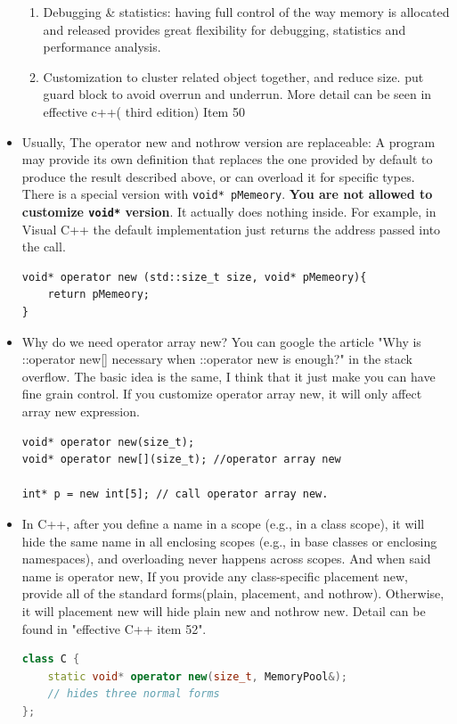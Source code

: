 \documentclass[a4paper,11pt,twoside]{book}
\begin{document}
\begin{itemize}
\begin{enumerate}
		\item Debugging \& statistics: having full control of the way memory is allocated and released provides great flexibility for debugging, statistics and performance analysis.
		
		\item Customization to cluster related object together, and reduce size. put guard block to avoid overrun and underrun. More detail can be seen in effective c++( third edition) Item 50
	\end{enumerate}
	
	\item Usually, The operator new and nothrow version are replaceable: A program may provide its own definition that replaces the one provided by default to produce the result described above, or can overload it for specific types. There is a special version with \texttt{void* pMemeory}. \textbf{You are not allowed to customize \texttt{void*} version}. It actually does nothing inside. For example, in Visual C++ the default implementation just returns the address passed into the call.
\begin{lstlisting}[numbers=none]
void* operator new (std::size_t size, void* pMemeory){
	return pMemeory;
}	
\end{lstlisting}	

	\item Why do we need operator array new? You can google the article "Why is ::operator new[] necessary when ::operator new is enough?" in the stack overflow. The basic idea is the same, I think that it just make you can have fine grain control. If you customize operator array new, it will only affect array new expression.  
\begin{lstlisting}[numbers=none]
void* operator new(size_t);
void* operator new[](size_t); //operator array new

int* p = new int[5]; // call operator array new.
\end{lstlisting}

	

	\item In C++, after you define a name in a scope (e.g., in a class scope), it will hide the same name in all enclosing scopes (e.g., in base classes or enclosing namespaces), and overloading never happens across scopes. And when said name is operator new, If you provide any class-specific placement new, provide all of the standard forms(plain, placement, and nothrow). Otherwise, it will placement new will hide plain new and nothrow new. Detail can be found in "effective C++ item 52".
\begin{lstlisting}[frame=single, language=c++, mathescape=true]
class C {
	static void* operator new(size_t, MemoryPool&);
	// hides three normal forms
};


\end{lstlisting}
\end{itemize}
\end{document}
